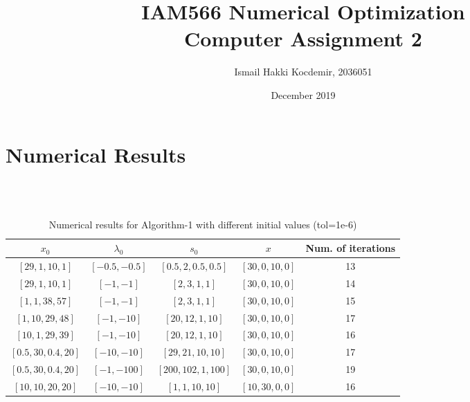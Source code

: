 \documentclass{article}
\title{IAM566 Numerical Optimization \\ Computer Assignment 2}
\author{Ismail Hakki Kocdemir, 2036051}
\date{December 2019}
\begin{document}
\maketitle

\section{Numerical Results}
\begin{table}[h]
\centering
\caption{Numerical results for Algorithm-1 with different initial values (tol=1e-6)} \\ \\
\begin{tabular}{ccc|cc}
\hline
$x_0$ & $\lambda_0$ & $s_0$ & $x$ & Num. of iterations \\ \hline

$[29,1,10,1]$  &  $[-0.5,-0.5]$  & $[0.5,2,0.5,0.5]$ & $[30,0,10,0]$ & 13 \\
 $[29,1,10,1]$  &  $[-1,-1]$  & $[2,3,1,1]$ & $[30,0,10,0]$ & 14     \\   
 $[1,1,38,57]$  &  $[-1,-1]$  & $[2,3,1,1]$ & $[30,0,10,0]$ & 15     \\ 
 $[1,10,29,48]$  &  $[-1,-10]$  & $[20,12,1,10]$ & $[30,0,10,0]$ & 17  \\ 
 $[10,1,29,39]$  &  $[-1,-10]$  & $[20,12,1,10]$ & $[30,0,10,0]$ & 16  \\
 $[0.5,30,0.4,20]$  &  $[-10,-10]$  & $[29,21,10,10]$ & $[30,0,10,0]$ & 17  \\ $[0.5,30,0.4,20]$  &  $[-1,-100]$  & $[200,102,1,100]$ & $[30,0,10,0]$ & 19 \\
 $[10,10,20,20]$  &  $[-10,-10]$  & $[1,1,10,10]$ & $[10,30,0,0]$ & 16 \\ \hline
\end{tabular}
\end{table}
\end{document}
